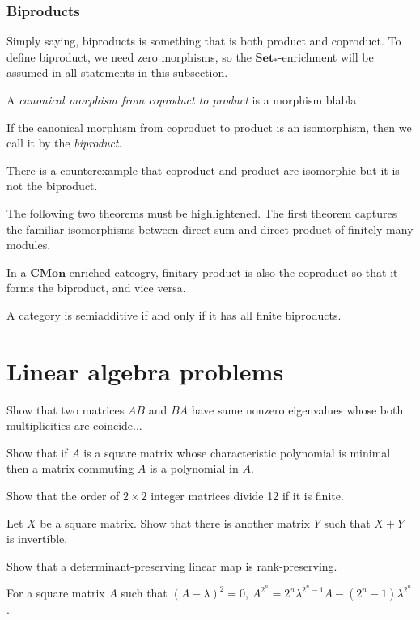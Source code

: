 \documentclass[a4paper]{article}
\begin{document}
\subsubsection{Biproducts}
Simply saying, biproducts is something that is both product and coproduct.
To define biproduct, we need zero morphisms, so the $\mathbf{Set_*}$-enrichment will be assumed in all statements in this subsection.
\begin{defn}
A \emph{canonical morphism from coproduct to product} is a morphism blabla
\end{defn}
\begin{defn}[Biproduct]
If the canonical morphism from coproduct to product is an isomorphism, then we call it by the \emph{biproduct}.
\end{defn}
There is a counterexample that coproduct and product are isomorphic but it is not the biproduct.




The following two theorems must be highlightened.
The first theorem captures the familiar isomorphisms between direct sum and direct product of finitely many modules.
\begin{thm}
In a $\mathbf{CMon}$-enriched cateogry, finitary product is also the coproduct so that it forms the biproduct, and vice versa.
\end{thm}

\begin{thm}
A category is semiadditive if and only if it has all finite biproducts.
\end{thm}




\newpage
\section{Linear algebra problems}

	\begin{prb}
	Show that two matrices $AB$ and $BA$ have same nonzero eigenvalues whose both multiplicities are coincide...
	\end{prb}

	\begin{prb}
	Show that if $A$ is a square matrix whose characteristic polynomial is minimal then a matrix commuting $A$ is a polynomial in $A$.
	\end{prb}

	\begin{prb}
	Show that the order of $2\times 2$ integer matrices divide 12 if it is finite.
	\end{prb}

	\begin{prb}
	Let $X$ be a square matrix. Show that there is another matrix $Y$ such that $X+Y$ is invertible.
	\end{prb}

	\begin{prb}
	Show that a determinant-preserving linear map is rank-preserving.
	\end{prb}

	\begin{prb}
	For a square matrix $A$ such that $(A-\lambda)^2=0$, $A^{2^n}=2^n\lambda^{2^n-1}A-(2^n-1)\lambda^{2^n}$.
	\end{prb}
\end{document}
